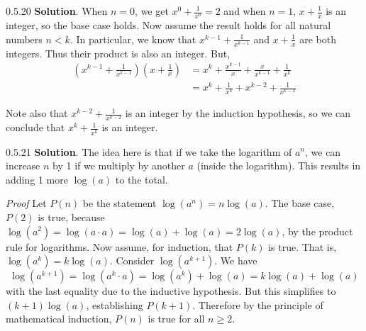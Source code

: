 \documentclass[11pt,]{book}
\makeatletter
\theoremstyle{ptxplainnotitle}
\theoremstyle{ptxplaintitle}
\renewcommand*{\proofname}{Proof}
\renewenvironment{proof}[1][\proofname]{\par
  \pushQED{\qed}%
  \normalfont \topsep6\p@\@plus6\p@\relax
  \trivlist
  \item\relax
    {\itshape
    #1\@addpunct{.}}\hspace\labelsep\ignorespaces
}{%
  \popQED\endtrivlist\@endpefalse
}
\theoremstyle{ptxdefinitionnotitle}
\theoremstyle{ptxdefinitiontitle}
\theoremstyle{ptxdefinitionnotitle}
\theoremstyle{ptxdefinitiontitle}
\theoremstyle{ptxdefinitionnotitle}
\theoremstyle{ptxdefinitiontitle}
\theoremstyle{ptxdefinitiontitlenonumber}
\theoremstyle{ptxdefinitiontitlenonumber}
\numberwithin{equation}{chapter}
\newcommand{\lt}{<}
\newcommand{\amp}{&}
\makeatother
\begin{document}
\begin{divisionexercise}{0.5.20}
\textbf{Solution}.\quad%
\hypertarget{p-683}{}%
When \(n = 0\), we get \(x^0 +\frac{1}{x^0} = 2\) and when \(n = 1\), \(x + \frac{1}{x}\) is an integer, so the base case holds. Now assume the result holds for all natural numbers \(n \lt  k\). In particular, we know that \(x^{k-1} + \frac{1}{x^{k-1}}\) and \(x + \frac{1}{x}\) are both integers. Thus their product is also an integer. But,%
\begin{align*}
\left(x^{k-1} + \frac{1}{x^{k-1}}\right)\left(x + \frac{1}{x}\right) \amp = x^k + \frac{x^{k-1}}{x} + \frac{x}{x^{k-1}} + \frac{1}{x^k}\\
\amp = x^k + \frac{1}{x^k} + x^{k-2} + \frac{1}{x^{k-2}}
\end{align*}
%
\par
\hypertarget{p-684}{}%
Note also that \(x^{k-2} + \frac{1}{x^{k-2}}\) is an integer by the induction hypothesis, so we can conclude that \(x^k + \frac{1}{x^k}\) is an integer.%
\end{divisionexercise}%
\begin{divisionexercise}{0.5.21}
\textbf{Solution}.\quad%
\hypertarget{p-686}{}%
The idea here is that if we take the logarithm of \(a^n\), we can increase \(n\) by 1 if we multiply by another \(a\) (inside the logarithm). This results in adding 1 more \(\log(a)\) to the total.%
\begin{proof}\hypertarget{proof-21}{}
\hypertarget{p-687}{}%
Let \(P(n)\) be the statement \(\log(a^n) = n \log(a)\). The base case, \(P(2)\) is true, because \(\log(a^2) = \log(a\cdot a) = \log(a) + \log(a) = 2\log(a)\), by the product rule for logarithms. Now assume, for induction, that \(P(k)\) is true. That is, \(\log(a^k) = k\log(a)\). Consider \(\log(a^{k+1})\). We have%
\begin{equation*}
\log(a^{k+1}) = \log(a^k\cdot a) = \log(a^k) + \log(a) = k\log(a) + \log(a)
\end{equation*}
with the last equality due to the inductive hypothesis. But this simplifies to \((k+1) \log(a)\), establishing \(P(k+1)\). Therefore by the principle of mathematical induction, \(P(n)\) is true for all \(n \ge 2\).%
\end{proof}
\end{divisionexercise}%
\end{document}
